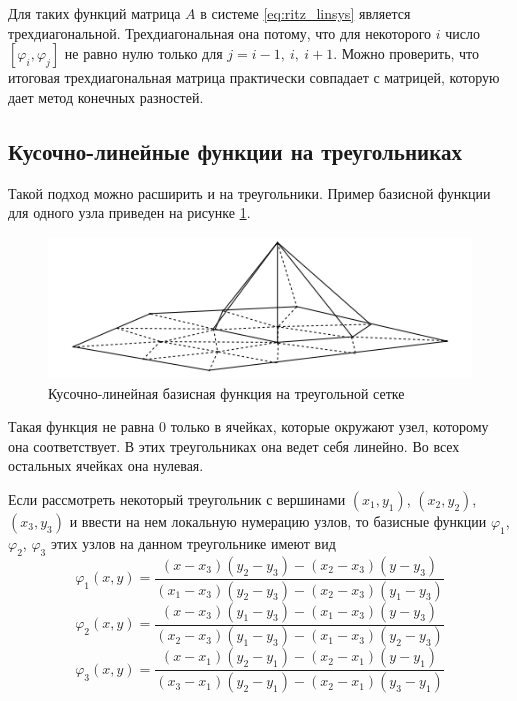 \documentclass[a4paper, 11pt]{article}
\begin{document}
Для таких функций матрица $A$ в системе \eqref{eq:ritz_linsys} является трехдиагональной. Трехдиагональная она потому, что для некоторого $i$ число $[\varphi_i, \varphi_j]$ не равно нулю только для $j = i-1,~i,~i+1$. Можно проверить, что итоговая трехдиагональная матрица практически совпадает с матрицей, которую дает метод конечных разностей.

\subsection{Кусочно-линейные функции на треугольниках}
Такой подход можно расширить и на треугольники. Пример базисной функции для одного узла приведен на рисунке \ref{pic:p1}.
\begin{figure}[h] \centering
	\includegraphics[scale=0.4]{p1}
	\caption{Кусочно-линейная базисная функция на треугольной сетке\label{pic:p1}}
\end{figure}
Такая функция не равна 0 только в ячейках, которые окружают узел, которому она соответствует. В этих треугольниках она ведет себя линейно. Во всех остальных ячейках она нулевая. 

Если рассмотреть некоторый треугольник с вершинами $(x_1,y_1)$, $(x_2,y_2)$, $(x_3,y_3)$ и ввести на нем локальную нумерацию узлов, то базисные функции $\varphi_1$, $\varphi_2$, $\varphi_3$ этих узлов на данном треугольнике имеют вид 
\begin{equation}\label{eq:loc_phi_1}
\varphi_1(x,y) = \frac{(x - x_3)(y_2 - y_3) - (x_2 - x_3)(y - y_3)}{(x_1 - x_3)(y_2 - y_3) - (x_2 - x_3)(y_1 - y_3)}
\end{equation}
\begin{equation}\label{eq:loc_phi_2}
\varphi_2(x,y) = \frac{(x - x_3)(y_1 - y_3) - (x_1 - x_3)(y - y_3)}{(x_2 - x_3)(y_1 - y_3) - (x_1 - x_3)(y_2 - y_3)}
\end{equation}
\begin{equation}\label{eq:loc_phi_3}
\varphi_3(x,y) = \frac{(x - x_1)(y_2 - y_1) - (x_2 - x_1)(y - y_1)}{(x_3 - x_1)(y_2 - y_1) - (x_2 - x_1)(y_3 - y_1)}
\end{equation}
\end{document}

